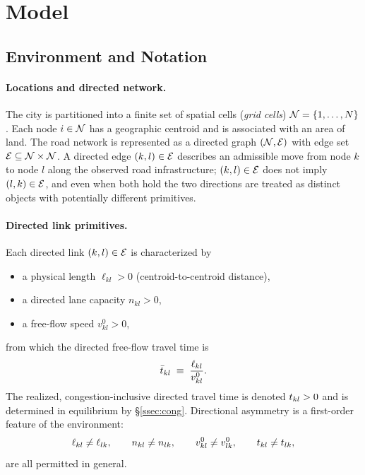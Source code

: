\tableofcontents
\clearpage

\section{Model}\label{sec:model}

\subsection{Environment and Notation}\label{ssec:env}

\paragraph{Locations and directed network.}
The city is partitioned into a finite set of spatial cells
(\emph{grid cells}) $\mathcal N=\{1,\dots,N\}$.  Each node $i\in\mathcal N$ has a
geographic centroid and is associated with an area of land.  The road
network is represented as a directed graph $(\mathcal N,\mathcal E)$ with edge set
$\mathcal E\subseteq\mathcal N\times\mathcal N$.  A directed edge $(k,l)\in\mathcal E$ describes an
admissible move from node $k$ to node $l$ along the observed road
infrastructure; $(k,l)\in\mathcal E$ does not imply $(l,k)\in\mathcal E$, and even when
both hold the two directions are treated as distinct objects with
potentially different primitives.

\paragraph{Directed link primitives.}
Each directed link $(k,l)\in\mathcal E$ is characterized by
\begin{itemize}[leftmargin=2em,itemsep=0.2em]
  \item a physical length $\ell_{kl}>0$ (centroid-to-centroid distance),
  \item a directed lane capacity $n_{kl}>0$,
  \item a free-flow speed $v^{0}_{kl}>0$,
\end{itemize}
from which the directed free-flow travel time is
\begin{equation}
  \bar t_{kl}\;\equiv\;\frac{\ell_{kl}}{v^{0}_{kl}}.
  \label{eq:tbar_def}
\end{equation}
The realized, congestion-inclusive directed travel time is denoted
$t_{kl}>0$ and is determined in equilibrium by \S\ref{ssec:cong}.
Directional asymmetry is a first-order feature of the environment:
\[
  \ell_{kl}\neq \ell_{lk},\qquad
  n_{kl}\neq n_{lk},\qquad
  v^{0}_{kl}\neq v^{0}_{lk},\qquad
  t_{kl}\neq t_{lk},
\]
are all permitted in general.

